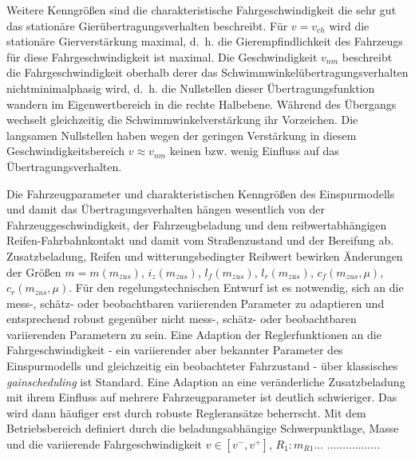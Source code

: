 Weitere Kenngrößen sind die charakteristische Fahrgeschwindigkeit die sehr gut das stationäre Gierübertragungsverhalten beschreibt. Für $v=v_{ch}$ wird die stationäre Gierverstärkung maximal, d.~h. die Gierempfindlichkeit des Fahrzeugs für diese Fahrgeschwindigkeit ist maximal. Die Geschwindigkeit $v_{nm}$ beschreibt die Fahrgeschwindigkeit oberhalb derer das Schwimmwinkelübertragungsverhalten nichtminimalphasig wird, d.~h. die Nullstellen dieser Übertragungsfunktion wandern im Eigenwertbereich in die rechte Halbebene. Während des Übergangs wechselt gleichzeitig die Schwimmwinkelverstärkung ihr Vorzeichen. Die langsamen Nullstellen haben wegen der geringen Verstärkung in diesem Geschwindigkeitsbereich $v\approx v_{nm}$ keinen bzw. wenig Einfluss auf das Übertragungsverhalten.    

Die Fahrzeugparameter und charakteristischen Kenngrößen des Einspurmodells und damit das Übertragungsverhalten hängen wesentlich von der Fahrzeuggeschwindigkeit, der Fahrzeugbeladung und dem reibwertabhängigen Reifen-Fahrbahnkontakt und damit vom Straßenzustand und der Bereifung ab.
Zusatzbeladung, Reifen und witterungsbedingter Reibwert bewirken Änderungen der Größen $m = m(m_{zus})$, $i_z(m_{zus})$, $l_f(m_{zus})$, $l_r(m_{zus})$, $c_f(m_{zus},\mu)$, $c_r(m_{zus},\mu)$. Für den regelungstechnischen Entwurf ist es notwendig, sich an die mess-, schätz- oder beobachtbaren variierenden Parameter zu adaptieren und entsprechend robust gegenüber nicht mess-, schätz- oder beobachtbaren variierenden Parametern zu sein. Eine Adaption der Reglerfunktionen an die Fahrgeschwindigkeit - ein variierender aber bekannter Parameter des Einspurmodells und gleichzeitig ein beobachteter Fahrzustand - über klassisches \textit{gainscheduling} ist Standard. Eine Adaption an eine veränderliche Zusatzbeladung mit ihrem Einfluss auf mehrere Fahrzeugparameter ist deutlich schwieriger. Das wird dann häufiger erst durch robuste Regleransätze beherrscht. 
Mit dem Betriebsbereich definiert durch die beladungsabhängige Schwerpunktlage, Masse und die variierende Fahrgeschwindigkeit $v\in[v^-, v^+]$, $R_1: m_{R1}$... ................. 

